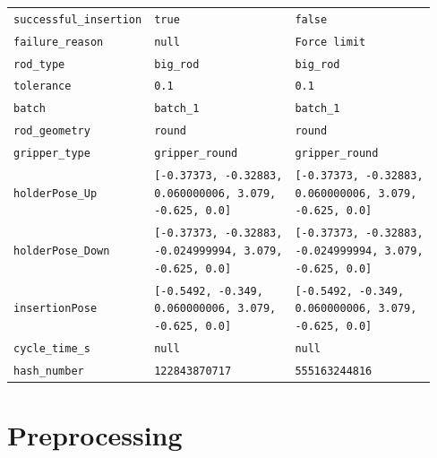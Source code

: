 \begin{table}[htbp]
\begin{tabular}{lll}
        \hline
        \texttt{successful\_insertion} & \texttt{true} & \texttt{false} \\
        \texttt{failure\_reason} & \texttt{null} & \texttt{Force limit} \\
        \hline
        \texttt{rod\_type} & \texttt{big\_rod} & \texttt{big\_rod} \\
        \texttt{tolerance} & \texttt{0.1} & \texttt{0.1} \\
        \texttt{batch} & \texttt{batch\_1} & \texttt{batch\_1} \\
        \texttt{rod\_geometry} & \texttt{round} & \texttt{round} \\
        \texttt{gripper\_type} & \texttt{gripper\_round} & \texttt{gripper\_round} \\
        \hline
        \texttt{holderPose\_Up} &
        \makecell[l]{\texttt{[-0.37373, -0.32883,}\\\texttt{0.060000006, 3.079,}\\\texttt{-0.625, 0.0]}} &
        \makecell[l]{\texttt{[-0.37373, -0.32883,}\\\texttt{0.060000006, 3.079,}\\\texttt{-0.625, 0.0]}} \\
        \texttt{holderPose\_Down} &
        \makecell[l]{\texttt{[-0.37373, -0.32883,}\\\texttt{-0.024999994, 3.079,}\\\texttt{-0.625, 0.0]}} &
        \makecell[l]{\texttt{[-0.37373, -0.32883,}\\\texttt{-0.024999994, 3.079,}\\\texttt{-0.625, 0.0]}} \\
        \texttt{insertionPose} &
        \makecell[l]{\texttt{[-0.5492, -0.349,}\\\texttt{0.060000006, 3.079,}\\\texttt{-0.625, 0.0]}} &
        \makecell[l]{\texttt{[-0.5492, -0.349,}\\\texttt{0.060000006, 3.079,}\\\texttt{-0.625, 0.0]}} \\
        \hline
        \texttt{cycle\_time\_s} & \texttt{null} & \texttt{null} \\
        \texttt{hash\_number} & \texttt{122843870717} & \texttt{555163244816} \\
        \hline
    \end{tabular}
\end{table}

\newpage
\section{Preprocessing}\label{sec:dataset_preprocessing}


